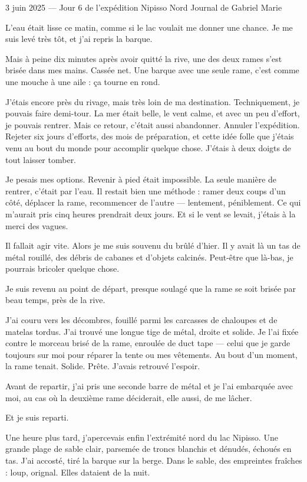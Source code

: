 3 juin 2025 — Jour 6 de l’expédition Nipisso Nord
Journal de Gabriel Marie

L’eau était lisse ce matin, comme si le lac voulait me donner une chance. Je me suis levé très tôt, et j’ai repris la barque.

Mais à peine dix minutes après avoir quitté la rive, une des deux rames s’est brisée dans mes mains. Cassée net. Une barque avec une seule rame, c’est comme une mouche à une aile : ça tourne en rond.

J’étais encore près du rivage, mais très loin de ma destination. Techniquement, je pouvais faire demi-tour. La mer était belle, le vent calme, et avec un peu d’effort, je pouvais rentrer. Mais ce retour, c’était aussi abandonner. Annuler l’expédition. Rejeter six jours d’efforts, des mois de préparation, et cette idée folle que j’étais venu au bout du monde pour accomplir quelque chose. J’étais à deux doigts de tout laisser tomber.

Je pesais mes options. Revenir à pied était impossible. La seule manière de rentrer, c’était par l’eau. Il restait bien une méthode : ramer deux coups d’un côté, déplacer la rame, recommencer de l’autre — lentement, péniblement. Ce qui m’aurait pris cinq heures prendrait deux jours. Et si le vent se levait, j’étais à la merci des vagues.

Il fallait agir vite. Alors je me suis souvenu du brûlé d’hier. Il y avait là un tas de métal rouillé, des débris de cabanes et d’objets calcinés. Peut-être que là-bas, je pourrais bricoler quelque chose.

Je suis revenu au point de départ, presque soulagé que la rame se soit brisée par beau temps, près de la rive.

J’ai couru vers les décombres, fouillé parmi les carcasses de chaloupes et de matelas tordus. J’ai trouvé une longue tige de métal, droite et solide. Je l’ai fixée contre le morceau brisé de la rame, enroulée de duct tape — celui que je garde toujours sur moi pour réparer la tente ou mes vêtements. Au bout d’un moment, la rame tenait. Solide. Prête. J’avais retrouvé l’espoir.

Avant de repartir, j’ai pris une seconde barre de métal et je l’ai embarquée avec moi, au cas où la deuxième rame déciderait, elle aussi, de me lâcher.

Et je suis reparti.

Une heure plus tard, j’apercevais enfin l’extrémité nord du lac Nipisso. Une grande plage de sable clair, parsemée de troncs blanchis et dénudés, échoués en tas. J’ai accosté, tiré la barque sur la berge. Dans le sable, des empreintes fraîches : loup, orignal. Elles dataient de la nuit.

